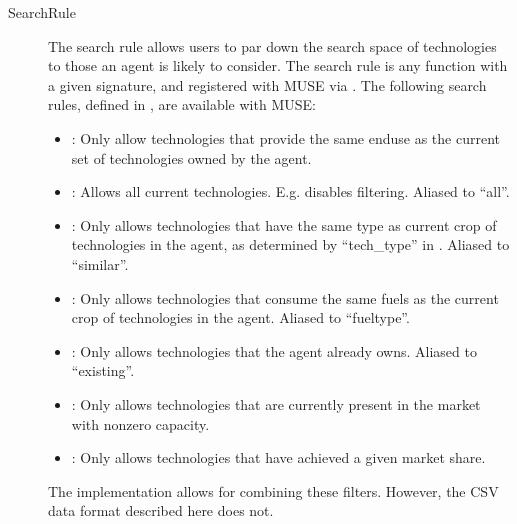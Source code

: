 \documentclass[letterpaper,10pt,english]{sphinxmanual}
\begin{document}
\label{\detokenize{inputs/agents:searchrule}}\begin{description}
\item[{SearchRule}] \leavevmode
The search rule allows users to par down the search space of technologies to those an
agent is likely to consider.
The search rule is any function with a given signature, and registered with MUSE via
. The following search rules, defined
in , are available with MUSE:
\begin{itemize}
\item {} 
: Only allow technologies that provide the same
enduse as the current set of technologies owned by the agent.

\item {} 
: Allows all current technologies. E.g. disables
filtering. Aliased to “all”.

\item {} 
: Only allows technologies that
have the same type as current crop of technologies in the agent, as determined by
“tech\_type” in {\hyperref[\detokenize{inputs/technodata:inputs-technodata}]{}}. Aliased to “similar”.

\item {} 
: Only allows technologies that consume the same
fuels as the current crop of technologies in the agent. Aliased to
“fueltype”.

\item {} 
: Only allows
technologies that the agent already owns. Aliased to “existing”.

\item {} 
: Only allows
technologies that are currently present in the market with non\sphinxhyphen{}zero capacity.

\item {} 
: Only allows technologies that have achieved a given
market share.

\end{itemize}

The implementation allows for combining these filters. However, the CSV data format
described here does not.

\end{description}
\end{document}
